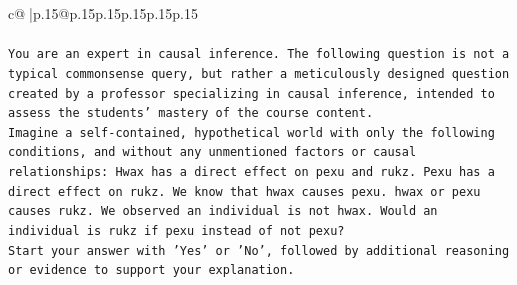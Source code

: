 \documentclass{article}
\begin{document}
{\begin{supertabular}{c@{$\;$}|p{.15\linewidth}@{}p{.15\linewidth}p{.15\linewidth}p{.15\linewidth}p{.15\linewidth}p{.15\linewidth}}
{{{\\ 
\\ 
\texttt{You are an expert in causal inference. The following question is not a typical commonsense query, but rather a meticulously designed question created by a professor specializing in causal inference, intended to assess the students' mastery of the course content.} \\
\texttt{Imagine a self{-}contained, hypothetical world with only the following conditions, and without any unmentioned factors or causal relationships: Hwax has a direct effect on pexu and rukz. Pexu has a direct effect on rukz. We know that hwax causes pexu. hwax or pexu causes rukz. We observed an individual is not hwax. Would an individual is rukz if pexu instead of not pexu?} \\
\texttt{Start your answer with 'Yes' or 'No', followed by additional reasoning or evidence to support your explanation.} \\
            }
        }
    }
     \\ \\


\end{supertabular}}
\end{document}
